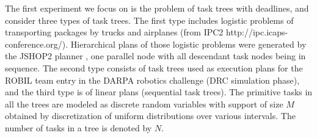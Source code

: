 \documentclass{article}
\begin{document}
The first experiment we focus on is the problem of task trees with deadlines, and consider three types of task trees. The first type includes logistic problems of transporting packages by trucks and airplanes (from IPC2 http://ipc.icaps-conference.org/). Hierarchical plans of those logistic problems were generated by the JSHOP2 planner \cite{nau2003shop2}, one parallel node with all descendant task nodes being in sequence. 
The second type consists of task trees used as execution plans for the ROBIL team entry in the DARPA robotics challenge (DRC simulation phase), and the third type is of linear plans (sequential task trees).
The primitive tasks in all the trees are modeled as discrete random variables with support of size $M$ obtained by discretization of uniform distributions over various intervals. The number of tasks in a tree is denoted by $N$. 
\end{document}
